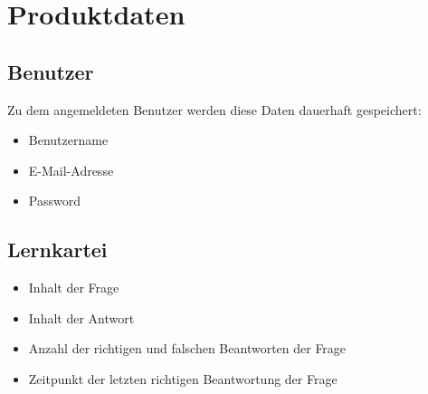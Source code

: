 \section{Produktdaten}
\subsection{Benutzer}
Zu dem angemeldeten Benutzer werden diese Daten dauerhaft gespeichert:
\begin{itemize}
	\item Benutzername
	\item E-Mail-Adresse
	\item Password
\end{itemize}

\subsection{Lernkartei}
\begin{itemize}
	\item Inhalt der Frage
	\item Inhalt der Antwort
	\item Anzahl der richtigen und falschen Beantworten der Frage
	\item Zeitpunkt der letzten richtigen Beantwortung der Frage
\end{itemize}